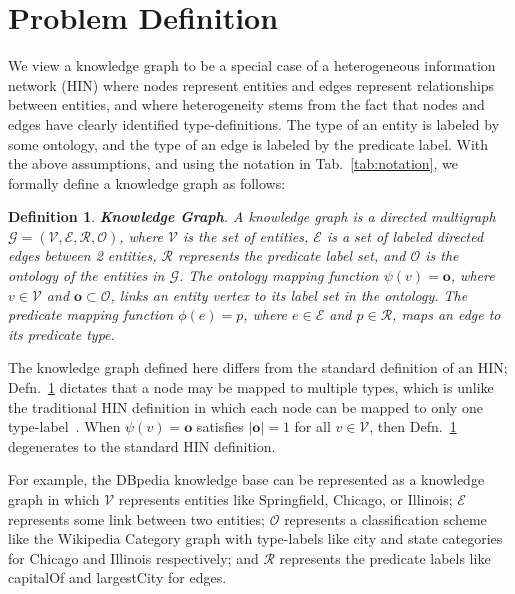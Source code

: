 \documentclass[reprint,twocolumn,showpacs,preprintnumbers,amsmath, aps,pre,amssymb]{revtex4-1}
\newtheorem{definition}{Definition}
\begin{document}
\section{Problem Definition} \label{sec:problem_definition}



We view a knowledge graph to be a special case of a heterogeneous information network (HIN) where nodes represent entities and edges represent relationships between entities, and where heterogeneity stems from the fact that nodes and edges have clearly identified type-definitions. The type of an entity is labeled by some ontology, and the type of an edge is labeled by the predicate label. With the above assumptions, and using the notation in Tab.~\ref{tab:notation}, we formally define a knowledge graph as follows:

\begin{definition} \label{def:knowledge_graph}
\textbf{Knowledge Graph}. A knowledge graph is a directed multigraph $\mathcal{G}=(\mathcal{V},\mathcal{E},\mathcal{R},\mathcal{O})$, where $\mathcal{V}$ is the set of entities, $\mathcal{E}$ is a set of labeled directed edges between 2 entities, $\mathcal{R}$ represents the predicate label set, and $\mathcal{O}$ is the ontology of the entities in $\mathcal{G}$. The ontology mapping function $\psi(v)=\mathbf{o}$, where $v \in \mathcal{V}$ and $\mathbf{o} \subset \mathcal{O}$, links an entity vertex to its label set in the ontology. The predicate mapping function $\phi(e) = p$, where $e \in \mathcal{E}$ and $p \in \mathcal{R}$, maps an edge to its predicate type.
\end{definition}

The knowledge graph defined here differs from the standard definition of an HIN; Defn.~\ref{def:knowledge_graph} dictates that a node may be mapped to multiple types, which is unlike the traditional HIN definition in which each node can be mapped to only one type-label~\cite{Sun2011}. When $\psi(v) = \mathbf{o}$ satisfies $|\mathbf{o}| = 1$ for all $v \in \mathcal{V}$, then Defn.~\ref{def:knowledge_graph} degenerates to the standard HIN definition.

For example, the DBpedia knowledge base can be represented as a knowledge graph in which $\mathcal{V}$ represents entities like \textsf{Springfield}, \textsf{Chicago}, or \textsf{Illinois}; $\mathcal{E}$ represents some link between two entities; $\mathcal{O}$ represents a classification scheme like the Wikipedia Category graph with type-labels like \textsf{city} and \textsf{state} categories for \textsf{Chicago} and \textsf{Illinois} respectively; and $\mathcal{R}$ represents the predicate labels like \textsf{capitalOf} and \textsf{largestCity} for edges.
\end{document}
